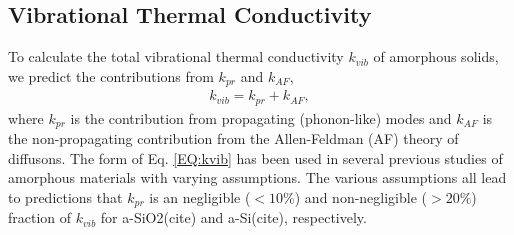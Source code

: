\documentclass[aps,prb,twocolumn,superscriptaddress,footinbib,amsmath,amssymb,floatfix]{revtex4}
\begin{document}
\subsection{\label{S:Theory:Thermal}Vibrational Thermal Conductivity}

To calculate the total vibrational thermal conductivity $k_{vib}$ 
of amorphous solids, we predict 
the contributions from $k_{pr}$ and $k_{AF}$, 
\begin{equation}\label{EQ:kvib}
\begin{split}
k_{vib} = k_{pr} + k_{AF},
\end{split}
\end{equation}
where $k_{pr}$\cite{ashcroft_solid_1976,dove_introduction_1993,
ziman_electrons_2001} is the contribution from 
propagating (phonon-like) modes and $k_{AF}$ is the non-propagating 
contribution 
from the Allen-Feldman (AF) theory of diffusons.
\cite{feldman_thermal_1993} The form of Eq. \eqref{EQ:kvib}
has been used in 
several previous studies of amorphous materials with varying 
assumptions.\cite{feldman_thermal_1993,cahill_thermal_1994,
liu_high_2009,yang_anomalously_2010,feldman_numerical_1999,
baldi_thermal_2008,he_heat_2011} 
The various 
assumptions all lead to predictions that $k_{pr}$ is an negligible 
($< 10\%$) 
and non-negligible ($> 20\%$) fraction of $k_{vib}$ 
for 
a-SiO2(cite) and 
a-Si(cite), respectively.  
\end{document}

